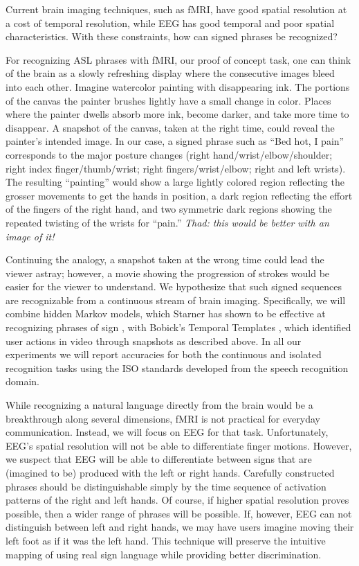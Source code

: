 \documentclass{proposal}
\begin{document}
Current brain imaging techniques, such as fMRI, have good spatial resolution at a cost of temporal resolution, while EEG has good temporal and poor spatial characteristics.  With these constraints, how can signed phrases be recognized?  

For recognizing ASL phrases with fMRI, our proof of concept task, one can think of the brain as a slowly refreshing display where the consecutive images bleed into each other.  Imagine watercolor painting with disappearing ink.  The portions of the canvas the painter brushes lightly have a small change in color. Places where the painter dwells absorb more ink, become darker, and take more time to disappear.  A snapshot of the canvas, taken at the right time, could reveal the painter's intended image. In our case, a signed phrase such as ``Bed hot, I pain'' corresponds to the major posture changes (right hand/wrist/elbow/shoulder; right index finger/thumb/wrist; right fingers/wrist/elbow; right and left wrists).  The resulting ``painting'' would show a large lightly colored region reflecting the grosser movements to get the hands in position, a dark region reflecting the effort of the fingers of the right hand, and two symmetric dark regions showing the repeated twisting of the wrists for ``pain.''
\textit{Thad:  this would be better with an image of it!}

Continuing the analogy, a snapshot taken at the wrong time could lead the viewer astray; however, a movie showing the progression of strokes would be easier for the viewer to understand.  We hypothesize that such signed sequences are recognizable from a continuous stream of brain imaging.  Specifically, we will combine hidden Markov models, which Starner has shown to be effective at recognizing phrases of sign \cite{starner1998rta}, with Bobick's Temporal Templates \cite{bobick2001rhm}, which identified user actions in video through snapshots as described above. In all our experiments we will report accuracies for both the continuous and isolated recognition tasks using the ISO standards developed from the speech recognition domain.

While recognizing a natural language directly from the brain would be a breakthrough along several dimensions, fMRI is not practical for everyday communication.  Instead, we will focus on EEG for that task.  Unfortunately, EEG's spatial resolution will not be able to differentiate finger motions.  However, we suspect that EEG will be able to differentiate between signs that are (imagined to be) produced with the left or right hands.  Carefully constructed phrases should be distinguishable simply by the time sequence of activation patterns of the right and left hands.  Of course, if higher spatial resolution proves possible, then a wider range of phrases will be possible.  If, however, EEG can not distinguish between left and right hands, we may have users imagine moving their left foot as if it was the left hand.  This technique will preserve the intuitive mapping of using real sign language while providing better discrimination.  
\end{document}
